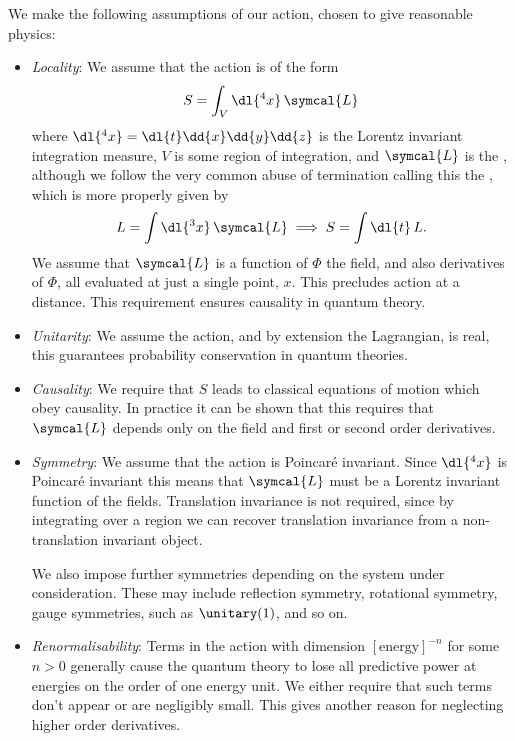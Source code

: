 \documentclass[fleqn]{NotesClass}
\newcommand{\lagrangianDensity}{\symcal{L}}
\begin{document}
    We make the following assumptions of our action, chosen to give reasonable physics:
    \begin{itemize}
        \item \textit{Locality}: We assume that the action is of the form
        \begin{equation}
            S = \int_{V} \dl{^4x}\, \lagrangianDensity
        \end{equation}
        where \(\dl{^4x} = \dl{t} \dd{x} \dd{y} \dd{z}\) is the Lorentz invariant integration measure, \(V\) is some region of integration, and \(\lagrangianDensity\) is the , although we follow the very common abuse of termination calling this the , which is more properly given by
        \begin{equation}
            L = \int \dl{^3x} \, \lagrangianDensity \implies S = \int \dl{t} \, L.
        \end{equation}
        We assume that \(\lagrangianDensity\) is a function of \(\Phi\) the field, and also derivatives of \(\Phi\), all evaluated at just a single point, \(x\).
        This precludes action at a distance.
        This requirement ensures causality in quantum theory.
        
        \item \textit{Unitarity}: We assume the action, and by extension the Lagrangian, is real, this guarantees probability conservation in quantum theories.
        
        \item \textit{Causality}: We require that \(S\) leads to classical equations of motion which obey causality.
        In practice it can be shown that this requires that \(\lagrangianDensity\) depends only on the field and first or second order derivatives.
        
        \item \textit{Symmetry}: We assume that the action is Poincar\'e invariant.
        Since \(\dl{^4x}\) is Poincar\'e invariant this means that \(\lagrangianDensity\) must be a Lorentz invariant function of the fields.
        Translation invariance is not required, since by integrating over a region we can recover translation invariance from a non-translation invariant object.
        
        We also impose further symmetries depending on the system under consideration.
        These may include reflection symmetry, rotational symmetry, gauge symmetries, such as \(\unitary(1)\), and so on.
        
        \item \textit{Renormalisability}: Terms in the action with dimension \([\text{energy}]^{-n}\) for some \(n > 0\) generally cause the quantum theory to lose all predictive power at energies on the order of one energy unit.
        We either require that such terms don't appear or are negligibly small.
        This gives another reason for neglecting higher order derivatives.
    \end{itemize}
    
\end{document}
